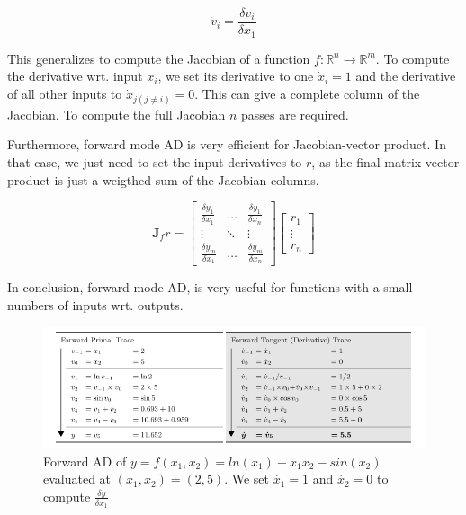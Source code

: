 \begin{equation}
    \dot{v}_i = \frac{\delta v_i}{\delta x_1}
\end{equation}

This generalizes to compute the Jacobian of a function $f: \mathbb{R}^n \xrightarrow{} \mathbb{R}^m$.
To compute the derivative wrt. input $x_i$, we set its derivative to one $\dot{x}_i = 1$ and the derivative of all other inputs to $\dot{x}_{j(j \ne i)} = 0$. This can give a complete column of the Jacobian. To compute the full Jacobian $n$ passes are required.

Furthermore, forward mode AD is very efficient for Jacobian-vector product. In that case, we just need to set the input derivatives to $r$, as the final matrix-vector product is just a weigthed-sum of the Jacobian columns.

\begin{equation}
    \mathbf{J}_f r = \left[\begin{array}{ccc}
        \frac{\delta y_1}{\delta x_1} & \hdots & \frac{\delta y_1}{\delta x_n}  \\
        \vdots & \ddots & \vdots \\
        \frac{\delta y_m}{\delta x_1} & \hdots & \frac{\delta y_m}{\delta x_n}
    \end{array}\right]
    \left[\begin{array}{c}
        r_1 \\
        \vdots \\
        r_n 
    \end{array}\right]
\end{equation}

In conclusion, forward mode AD, is very useful for functions with a small numbers of inputs wrt. outputs.


\begin{figure}[H]
    \centering
    \includegraphics[scale=0.6]{content/Forward_AD_example.png}
    \caption{Forward AD of $y=f(x_1, x_2)=ln(x_1)+x_1x_2-sin(x_2)$ evaluated at $(x_1, x_2)=(2, 5)$. We set $\dot{x_1}=1$ and $\dot{x_2}=0$ to compute $\frac{\delta y}{\delta x_1}$}
    \label{fig:my_label}
\end{figure}


